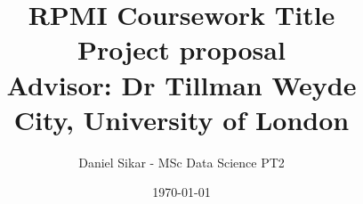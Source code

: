 \documentclass[12pt]{article}
\begin{document}
\title{%
  RPMI Coursework Title \\
  \large Project proposal \\
    Advisor: Dr Tillman Weyde \\
    City, University of London}
\author{Daniel Sikar - MSc Data Science PT2}
\date{\today} %

\maketitle %


% 

















\pagebreak
\printbibliography
\pagebreak



\end{document}
